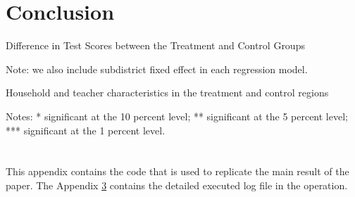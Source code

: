 \documentclass[12pt]{jfm}
\begin{document}
\section{Conclusion}






\newpage

\begin{table}
  \begin{center}
    \begin{footnotesize}
    \caption{Difference in Test Scores between the Treatment and Control Groups}
    \label{tab:baseline}
    

    Note: we also include subdistrict fixed effect in each regression model.
    \end{footnotesize}
  \end{center}
\end{table}

\begin{table}
  \begin{center}
    \begin{footnotesize}
    \caption{Household and teacher characteristics in the treatment and control regions}
    \label{tab:contamination}
    

    Notes: * significant at the 10 percent level; ** significant at the 5 percent level; *** significant at the 1 percent level.
    \end{footnotesize}
  \end{center}
\end{table}



\newpage


\appendix

\section{}\label{appA}

This appendix contains the code that is used to replicate the main result of the paper. The Appendix \ref{appB} contains the detailed executed log file in the operation.

\section{}\label{appB}
\end{document}
